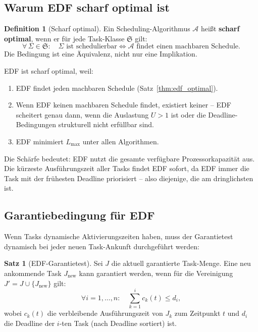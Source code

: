 ﻿\documentclass[a4paper,12pt]{report}
\theoremstyle{definition}
\newtheorem{definition}{Definition}[chapter]
\newtheorem{satz}{Satz}[chapter]
\begin{document}
\subsection{Warum EDF scharf optimal ist}

\begin{definition}[Scharf optimal]
	Ein Scheduling-Algorithmus $\mathcal{A}$ heißt \textbf{scharf optimal}, wenn er
	für jede Task-Klasse $\mathfrak{S}$ gilt:
	\[
		\forall\, \Sigma \in \mathfrak{S}: \quad
		\Sigma \text{ ist schedulierbar} \iff \mathcal{A} \text{ findet einen machbaren Schedule.}
	\]
	Die Bedingung ist eine Äquivalenz, nicht nur eine Implikation.
\end{definition}

EDF ist scharf optimal, weil:
\begin{enumerate}
	\item EDF findet jeden machbaren Schedule (Satz~\ref{thm:edf_optimal}).
	\item Wenn EDF keinen machbaren Schedule findet, existiert keiner -- EDF scheitert
	      genau dann, wenn die Auslastung $U > 1$ ist oder die Deadline-Bedingungen
	      strukturell nicht erfüllbar sind.
	\item EDF minimiert $L_{\max}$ unter allen Algorithmen.
\end{enumerate}

Die Schärfe bedeutet: EDF nutzt die gesamte verfügbare Prozessorkapazität aus.
Die kürzeste Ausführungszeit aller Tasks findet EDF sofort, da EDF immer die Task
mit der frühesten Deadline priorisiert -- also diejenige, die am dringlichsten ist.

\subsection{Garantiebedingung für EDF}

Wenn Tasks dynamische Aktivierungszeiten haben, muss der Garantietest
dynamisch bei jeder neuen Task-Ankunft durchgeführt werden:

\begin{satz}[EDF-Garantietest]
	Sei $J$ die aktuell garantierte Task-Menge. Eine neu ankommende Task $J_{\text{new}}$
	kann garantiert werden, wenn für die Vereinigung $J' = J \cup \{J_{\text{new}}\}$
	gilt:
	\[
		\forall i = 1, \ldots, n: \quad \sum_{k=1}^{i} c_k(t) \leq d_i,
	\]
	wobei $c_k(t)$ die verbleibende Ausführungszeit von $J_k$ zum Zeitpunkt $t$ und
	$d_i$ die Deadline der $i$-ten Task (nach Deadline sortiert) ist.
\end{satz}
\end{document}
